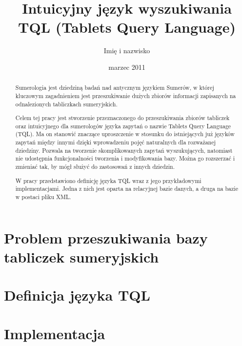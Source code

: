 \documentclass{pracamgr}
\author{Imię i nazwisko}
\title{Intuicyjny język wyszukiwania TQL (Tablets Query Language)}
\date{marzec 2011}
\begin{document}
\maketitle

\begin{abstract}
Sumerologia jest dziedziną badań nad antycznym językiem Sumerów, w której
kluczowym zagadnieniem jest przeszukiwanie dużych zbiorów informacji
zapisanych na odnalezionych tabliczkach sumeryjskich.

Celem tej pracy jest stworzenie przeznaczonego do przeszukiwania zbiorów tabliczek 
oraz intuicyjnego dla sumerologów języka zapytań o nazwie Tablets Query Language (TQL).
Ma on stanowić znaczące uproszczenie w stosunku do istniejących już języków 
zapytań między innymi dzięki wprowadzeniu pojęć naturalnych dla rozważanej dziedziny. 
Pozwala na tworzenie skomplikowanych zapytań wyszukujących, natomiast 
nie udostępnia funkcjonalności tworzenia i modyfikowania bazy. 
Można go rozszerzać i zmieniać tak, by mógł służyć do zastosowań z innych 
dziedzin.

W pracy przedstawiono definicję języka TQL wraz z jego przykładowymi implementacjami. 
Jedna z nich jest oparta na relacyjnej bazie danych, a druga na bazie w postaci pliku XML.

\end{abstract}

\tableofcontents

\part{Problem przeszukiwania bazy tabliczek sumeryjskich}




\part{Definicja języka TQL}


\part{Implementacja}





\end{document}
